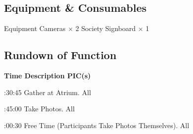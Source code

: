 \subsection{Equipment \& Consumables}
\starttabulate[|l|l|]
\NC{}Equipment\NC\NR
\HL
\NC Cameras \NC $\times$ 2 \NR
\NC Society Signboard \NC $\times$ 1 \NR
\HL
\stoptabulate

\pagebreak
\subsection{Rundown of Function}

\setupTABLE[c][1][width=1.25in]
\setupTABLE[c][2][width=3.5in]
\setupTABLE[c][3][width=1.25in]
\bTABLE
\bTABLEhead

\bTR\bTH    \bf{Time}
\eTH\bTH    \bf{Description}
\eTH\bTH    \bf{PIC(s)}
\eTH\eTR

\eTABLEhead
\bTABLEbody

\bTR{}:30:45
\eTD\bTD Gather at Atrium.
\eTD\bTD All
\eTD\eTR

\bTR{}:45:00
\eTD\bTD Take Photos.
\eTD\bTD All
\eTD\eTR

\bTR{}:00:30
\eTD\bTD Free Time (Participants Take Photos Themselves).
\eTD\bTD All
\eTD\eTR

\eTABLEbody
\eTABLE

\stopsection
\pagebreak

